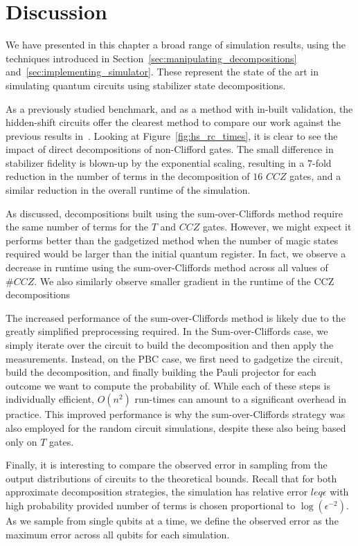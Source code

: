 \section{Discussion}
We have presented in this chapter a broad range of simulation results, using the techniques introduced in Section~\ref{sec:manipulating_decompositions} and~\ref{sec:implementing_simulator}. These represent the state of the art in simulating quantum circuits using stabilizer state decompositions.\par
As a previously studied benchmark, and as a method with in-built validation, the hidden-shift circuits offer the clearest method to compare our work against the previous results in~\cite{Bravyi2016}. Looking at Figure~\ref{fig:hs_rc_times}, it is clear to see the impact of direct decompositions of non-Clifford gates. The small difference in stabilizer fidelity is blown-up by the exponential scaling, resulting in a $7$-fold reduction in the number of terms in the decomposition of $16$ $CCZ$ gates, and a similar reduction in the overall runtime of the simulation.\par
As discussed, decompositions built using the sum-over-Cliffords method require the same number of terms for the $T$ and $CCZ$ gates. However, we might expect it performs better than the gadgetized method when the number of magic states required would be larger than the initial quantum register. In fact, we observe a decrease in runtime using the sum-over-Cliffords method across all values of $\# CCZ$. We also similarly observe smaller gradient in the runtime of the CCZ decompositions\par
The increased performance of the sum-over-Cliffords method is likely due to the greatly simplified preprocessing required. In the Sum-over-Cliffords case, we simply iterate over the circuit to build the decomposition and then apply the measurements. Instead, on the PBC case, we first need to gadgetize the circuit, build the decomposition, and finally building the Pauli projector for each outcome we want to compute the probability of. While each of these steps is individually efficient, $O(n^{2})$ run-times can amount to a significant overhead in practice. This improved performance is why the sum-over-Cliffords strategy was also employed for the random circuit simulations, despite these also being based only on $T$ gates.\par
Finally, it is interesting to compare the observed error in sampling from the output distributions of circuits to the theoretical bounds. Recall that for both approximate decomposition strategies, the simulation has relative error $leq \epsilon$ with high probability provided  number of terms is chosen proportional to $\log\left(\epsilon^{-2}\right)$. As we sample from single qubits at a time, we define the observed error as the maximum error across all qubits for each simulation. \par
